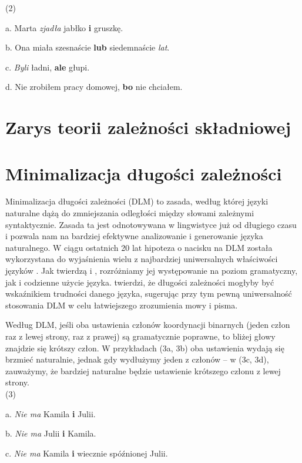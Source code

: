 \documentclass[licencjacka]{pracamgr_Kogni}
\begin{document}
(2)

a. Marta \textit{zjadła} jabłko \textbf{i} gruszkę.

b. Ona miała szesnaście \textbf{lub} siedemnaście \textit{lat}.

c. \textit{Byli} ładni, \textbf{ale} głupi.

d. Nie zrobiłem pracy domowej, \textbf{bo} nie chciałem.

\section{Zarys teorii zależności składniowej}
\citep{Liu2008}

\section{Minimalizacja długości zależności}
Minimalizacja długości zależności (DLM) to zasada, według której języki naturalne dążą do zmniejszania odległości między słowami zależnymi syntaktycznie. Zasada ta jest odnotowywana w lingwistyce już od długiego czasu i pozwala nam na bardziej efektywne analizowanie i generowanie języka naturalnego. W ciągu ostatnich 20 lat hipoteza o nacisku na DLM została wykorzystana do wyjaśnienia wielu z najbardziej uniwersalnych właściwości języków \citep{FutrellEtAl2015}.
Jak twierdzą \citet{Hawkins1994} i \citet{FutrellEtAl2020}, rozróżniamy jej występowanie na poziom gramatyczny, jak i codzienne użycie języka. \citet{Liu2008} twierdzi, że długości zależności mogłyby być wskaźnikiem trudności danego języka, sugerując przy tym pewną uniwersalność stosowania DLM w celu łatwiejszego zrozumienia mowy i pisma.

Według DLM, jeśli oba ustawienia członów koordynacji binarnych (jeden człon raz z lewej strony, raz z prawej) są gramatycznie poprawne, to bliżej głowy znajdzie się krótszy człon. W przykładach (3a, 3b) oba ustawienia wydają się brzmieć naturalnie, jednak gdy wydłużymy jeden z członów -- w (3c, 3d), zauważymy, że bardziej naturalne będzie ustawienie krótszego członu z lewej strony.
\\

(3)

a. \textit{Nie ma} Kamila \textbf{i} Julii.

b. \textit{Nie ma} Julii \textbf{i} Kamila.

c. \textit{Nie ma} Kamila \textbf{i} wiecznie spóźnionej Julii.
\end{document}
